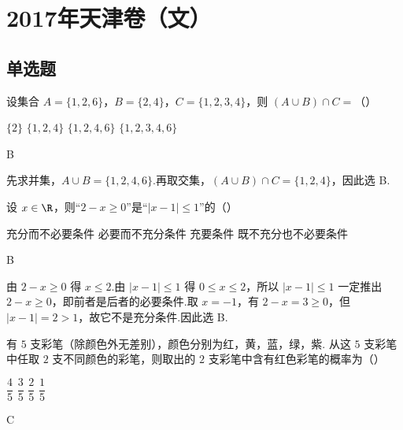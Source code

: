\chapter{2017年天津卷（文）}

\section{单选题}

\begin{problem}
设集合 \(A=\{1,2,6\}\)，\(B=\{2,4\}\)，\(C=\{1,2,3,4\}\)，则 \((A\cup B)\cap C=\)（\quad）

\choices
    {\(\{2\}\)}
    {\(\{1,2,4\}\)}
    {\(\{1,2,4,6\}\)}
    {\(\{1,2,3,4,6\}\)}
\end{problem}

\begin{answer}
B
\end{answer}

\begin{solution}
先求并集，\(A\cup B=\{1,2,4,6\}\).再取交集，\((A\cup B)\cap C=\{1,2,4\}\)，因此选 B.
\end{solution}

\begin{problem}
设 \(x\in\R\)，则“\(2-x\ge 0\)”是“\(|x-1|\le 1\)”的（\quad）

\choices
    {充分而不必要条件}
    {必要而不充分条件}
    {充要条件}
    {既不充分也不必要条件}
\end{problem}

\begin{answer}
B
\end{answer}

\begin{solution}
由 \(2-x\ge0\) 得 \(x\le2\).由 \(|x-1|\le1\) 得 \(0\le x\le2\)，所以 \(|x-1|\le1\) 一定推出 \(2-x\ge0\)，即前者是后者的必要条件.取 \(x=-1\)，有 \(2-x=3\ge0\)，但 \(|x-1|=2>1\)，故它不是充分条件.因此选 B.
\end{solution}

\begin{problem}
有 \(5\) 支彩笔（除颜色外无差别），颜色分别为红，黄，蓝，绿，紫. 从这 \(5\) 支彩笔中任取 \(2\) 支不同颜色的彩笔，则取出的 \(2\) 支彩笔中含有红色彩笔的概率为（\quad）

\choices
    {\(\dfrac45\)}
    {\(\dfrac35\)}
    {\(\dfrac25\)}
    {\(\dfrac15\)}
\end{problem}

\begin{answer}
C
\end{answer}

